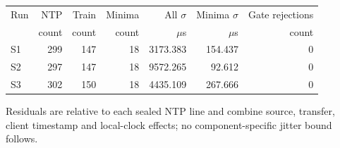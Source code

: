 \begin{center}\small
\begin{tabular}{lrrrrrr}\toprule
Run & NTP & Train & Minima & All $\sigma$ & Minima $\sigma$ & Gate rejections \\
 & count & count & count & $\mu$s & $\mu$s & count \\ \midrule
S1 & 299 & 147 & 18 & 3173.383 & 154.437 & 0 \\
S2 & 297 & 147 & 18 & 9572.265 & 92.612 & 0 \\
S3 & 302 & 150 & 18 & 4435.109 & 267.666 & 0 \\
\bottomrule\end{tabular}\end{center}
{\small Residuals are relative to each sealed NTP line and combine source, transfer, client timestamp and local-clock effects; no component-specific jitter bound follows.}

